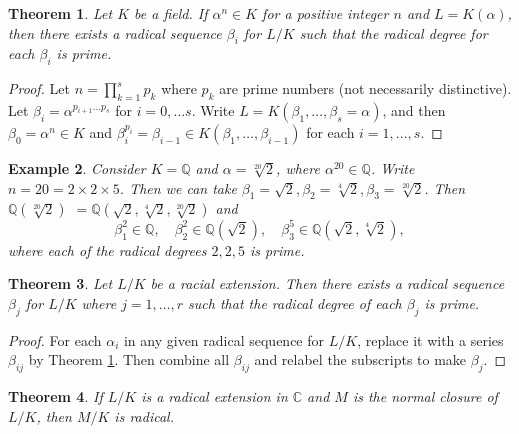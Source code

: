 \documentclass[12pt]{article}
\newtheorem{theorem}{Theorem}
\newtheorem{example}[theorem]{Example}
\begin{document}
\begin{theorem} \label{thm:radical-single-prime}
    Let $K$ be a field. If $\alpha ^ n \in K$ for a positive integer $n$ and
    $L = K (\alpha)$, then there exists a radical sequence $\beta_i$ for $L /
        K$
    such that the radical degree for each $\beta_i$ is prime.
\end{theorem}

\begin{proof}
    Let $n = \prod_{k=1}^{s} p_{k}$ where $p_{k}$ are prime numbers (not
    necessarily distinctive). Let $\beta_{i} = \alpha^ {p_{i + 1} \dots
            p_{s}}$
    for $i = 0, \dots s$. Write $L = K(\beta_1,  \dots, \beta_s = \alpha)$, and
    then $\beta_0 = \alpha^n \in K$ and  $\beta_i ^ {p_i} = \beta_{i-1} \in
        K(\beta_1, \dots, \beta_{i - 1})$ for each $i  = 1, \dots, s$.
\end{proof}

\begin{example}
    Consider $K  = \mathbb Q$ and $\alpha = \sqrt[20]{2}$, where $\alpha ^ {20}
        \in \mathbb Q$. Write $n = 20 =  2 \times 2 \times 5 $. Then we can
    take
    $\beta_1 = \sqrt 2, \beta_2 = \sqrt[4]{2}, \beta_3 = \sqrt[20]{2}$. Then
    $\mathbb Q(\sqrt[20]{2}) $ $= \mathbb Q(\sqrt{2}, \sqrt[4]{2},
        \sqrt[20]{2})$
    and
    $$
        \beta_1 ^ 2 \in \mathbb Q, \quad \beta_2 ^ 2 \in \mathbb Q(\sqrt{2}),
        \quad
        \beta_3^5 \in \mathbb Q (\sqrt{2}, \sqrt[4]{2}),
    $$
    where each of the radical degrees $2, 2, 5$ is prime.
\end{example}

\begin{theorem} \label{thm:radical-all-prime}
    Let $L / K$ be a racial extension. Then there exists a radical sequence
    $\beta_j$ for $L / K$ where $j=1, \dots, r$ such that the radical degree of
    each $\beta_j$ is prime.
\end{theorem}

\begin{proof}
    For each $\alpha_i$ in any given radical sequence for $L / K$, replace it
    with a series $\beta_{ij}$ by Theorem \ref{thm:radical-single-prime}. Then
    combine all $\beta_{ij}$ and relabel the subscripts to make $\beta_{j}$.
\end{proof}

\begin{theorem} \label{thm:radical-closure}
    If $L / K$ is a radical extension in $\mathbb{C}$ and $M$ is the normal
    closure of $L / K$, then $M / K$ is radical.
\end{theorem}
\end{document}
